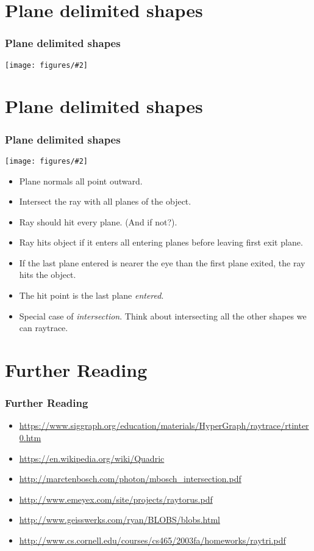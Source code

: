 \documentclass[slidestop,xcolor=pst]{beamer}
\newcommand{\mygraph}[2]{\texttt{[image: figures/\#2]}}
\newcommand{\mygraphc}[2]{\centerline{\texttt{[image: figures/\#2]}}}
\newcommand{\sect}[1]{
\section{#1}
\begin{frame}[fragile]\frametitle{#1}
}
\newcommand{\bi}{\begin{itemize}}
\newcommand{\ei}{\end{itemize}}
\begin{document}
\sect{Plane delimited shapes}
\mygraphc{0.6}{planedelimited.png}
\end{frame}

\sect{Plane delimited shapes}
\mygraph{0.3}{planedelimited.png}
\begin{minipage}{3in}
  \bi
\item Plane normals all point outward.
\item Intersect the ray with all planes of the object.
\item Ray should hit every plane.  (And if not?).
  \item Ray hits object if it enters all entering planes before
    leaving first exit plane.
\item If the last plane entered is nearer the eye than the first plane
  exited, the ray hits the object. 
\item The hit point is the last plane {\em entered}.
\item Special case of {\em intersection}.  Think about intersecting
  all the other shapes we can raytrace.
 \ei
\end{minipage}
\end{frame}



\sect{Further Reading}
\begin{itemize}
\item
\url{https://www.siggraph.org/education/materials/HyperGraph/raytrace/rtinter0.htm}
\item \url{https://en.wikipedia.org/wiki/Quadric}
\item \url{http://marctenbosch.com/photon/mbosch_intersection.pdf}
\item\url{http://www.emeyex.com/site/projects/raytorus.pdf}
\item
\url{http://www.geisswerks.com/ryan/BLOBS/blobs.html}
\item 
 \url{http://www.cs.cornell.edu/courses/cs465/2003fa/homeworks/raytri.pdf}
\end{itemize}
\end{frame}
\end{document}
